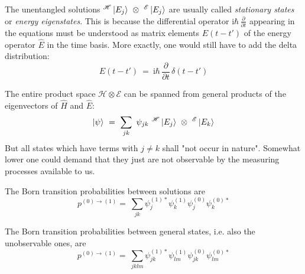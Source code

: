 \documentclass[12pt]{article}
\begin{document}
The unentangled solutions $^\mathscr{H}\ket{E_j}\ \otimes\ ^\mathscr{E}\ket{E_j}$ are usually called \emph{stationary states} or \emph{energy eigenstates}. This is because the differential operator $\mathrm{i}\hbar\,\frac{\partial}{\partial t}$ appearing in the equations must be understood as matrix elements $E(t-t')$ of the energy operator $\hat{E}$ in the time basis. More exactly, one would still have to add the delta distribution:
\begin{equation*}
E(t-t')\ =\ \mathrm{i}\hbar\,\frac{\partial}{\partial t}\,\delta(t-t')
\end{equation*}

The entire product space $\mathscr{H} \otimes \mathscr{E}$ can be spanned from general products of the eigenvectors of $\hat{H}$ and $\hat{E}$:
\begin{equation}
\label{eq:general_state}
\ket{\psi}\ =\ \sum_{jk}\ \psi_{jk}\ ^\mathscr{H}\ket{E_j}\ \otimes\ ^\mathscr{E}\ket{E_k}
\end{equation}
But all states which have terms with $j \neq k$ shall "not occur in nature". Somewhat lower one could demand that they just are not observable by the measuring processes available to us.

The Born transition probabilities between solutions are
\begin{equation} 
p^{(0)\rightarrow(1)} =\ \sum_{jk} \psi_j^{(1)*}\psi_k^{(1)}\psi_j^{(0)}\psi_k^{(0)*}
\end{equation}

The Born transition probabilities between general states, i.e. also the unobservable ones, are
\begin{equation} 
p^{(0)\rightarrow(1)} =\ \sum_{jklm} \psi_{jk}^{(1)*}\psi_{lm}^{(1)}\psi_{jk}^{(0)}\psi_{lm}^{(0)*}
\end{equation}
\end{document}
